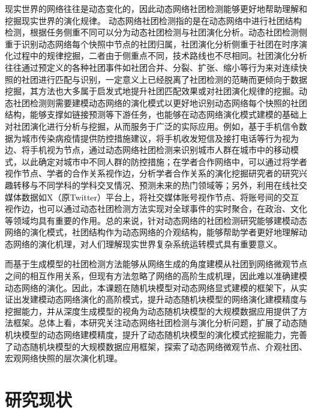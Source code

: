 现实世界的网络往往是动态变化的，因此动态网络社团检测能够更好地帮助理解和挖掘现实世界的演化规律。
动态网络社团检测指的是在动态网络中进行社团结构检测，根据任务侧重不同可以分为动态社团检测与社团演化分析。动态社团检测侧重于识别动态网络每个快照中节点的社团归属，社团演化分析侧重于社团在时序演化过程中的规律挖掘，二者由于侧重点不同，技术路线也不尽相同。社团演化分析往往通过预定义的各种社团事件如社团合并、分裂、扩张、缩小等行为\cite{palla2007quantifying}来对连续快照的社团进行匹配与识别，一定意义上已经脱离了社团检测的范畴而更倾向于数据挖掘，其方法也大多属于启发式地提升社团匹配效果或对社团演化规律的挖掘。动态社团检测则需要建模动态网络的演化模式以更好地识别动态网络每个快照的社团结构，能够支撑如链接预测等下游任务，也能够在动态网络演化模式建模的基础上对社团演化进行分析与挖掘，从而服务于广泛的实际应用\cite{farajtabar2017coevolve,kumar2024community}。例如，基于手机信令数据为城市传染病疫情提供防控措施建议\cite{he2024urban}，将手机收发短信及接打电话等行为视为边、将手机视为节点，通过动态网络社团检测来识别城市人群在城市中的移动模式，以此确定对城市中不同人群的防控措施；在学者合作网络中，可以通过将学者视作节点、学者的合作关系视作边，分析学者合作关系的演化挖掘研究者的研究兴趣转移与不同学科的学科交叉情况、预测未来的热门领域等\cite{wu2019large,wang2022weak}；另外，利用在线社交媒体数据如X（原Twitter）平台上，将社交媒体账号视作节点、将账号间的交互视作边，也可以通过动态社团检测方法实现对全球事件的实时聚合，在政治、文化等领域均具有重要的作用\cite{ma2024knowledge}。总的来说，针对动态网络的社团检测研究能够建模动态网络的演化模式，社团结构作为动态网络的介观结构，能够帮助学者更好地理解动态网络的演化机理，对人们理解现实世界复杂系统运转模式具有重要意义。

而基于生成模型的社团检测方法能够从网络生成的角度建模从社团到网络微观节点之间的相互作用关系，但现有方法忽略了网络的高阶生成机理，因此难以准确建模动态网络的演化。因此，本课题在随机块模型对动态网络显式建模的框架下，从实证出发建模动态网络演化的高阶模式，提升动态随机块模型的网络演化建模精度与挖掘能力，并从深度生成模型的视角为动态随机块模型的大规模数据应用提供了方法框架。总体上看，本研究关注动态网络社团检测与演化分析问题，扩展了动态随机块模型的动态网络建模精度，提升了动态随机块模型的演化模式挖掘能力，完善了动态随机块模型的大规模数据应用框架，探索了动态网络微观节点、介观社团、宏观网络快照的层次演化机理。





\section{研究现状}

